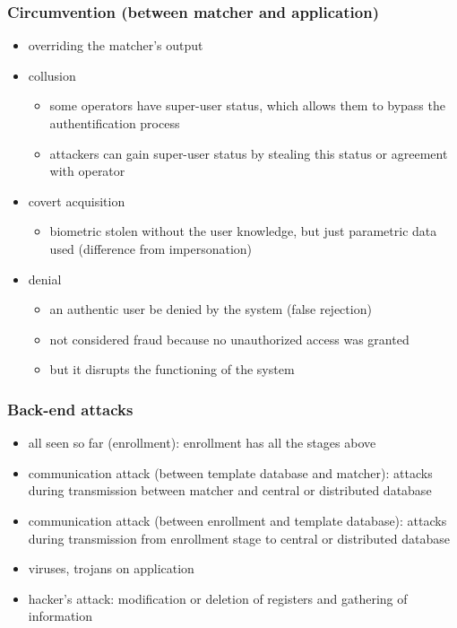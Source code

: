 \documentclass[paper=a4, fontsize=11pt]{scrartcl} %
\numberwithin{equation}{section} %
\numberwithin{figure}{section} %
\numberwithin{table}{section} %
\begin{document}
\subsubsection{Circumvention (between matcher and application)}

\begin{itemize}
\item overriding the matcher's output
\item collusion
\begin{itemize}
\item some operators have super-user status, which allows them to bypass the authentification process
\item attackers can gain super-user status by stealing this status or agreement with operator
\end{itemize}
\item covert acquisition
\begin{itemize}
\item biometric stolen without the user knowledge, but just parametric data used (difference from impersonation)
\end{itemize}
\item denial
\begin{itemize}
\item an authentic user be denied by the system (false rejection)
\item not considered fraud because no unauthorized access was granted
\item but it disrupts the functioning of the system
\end{itemize}
\end{itemize}

\subsubsection{Back-end attacks}

\begin{itemize}
\item all seen so far (enrollment): enrollment has all the stages above
\item communication attack (between template database and matcher): attacks during transmission between matcher and central or distributed database
\item communication attack (between enrollment and template database): attacks during transmission from enrollment stage to central or distributed database
\item viruses, trojans on application
\item hacker's attack: modification or deletion of registers and gathering of information
\end{itemize}
\end{document}
